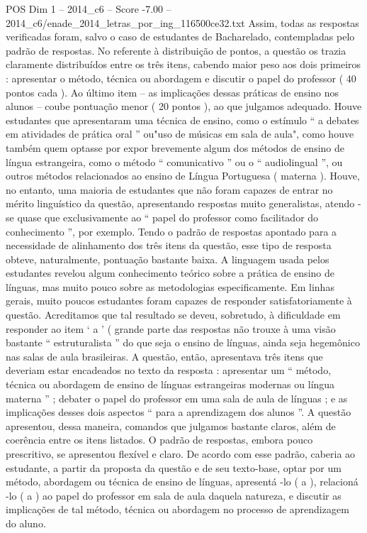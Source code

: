 \begin{textsample}{POS Dim 1 – 2014\_c6 – Score -7.00 – 2014\_c6/enade\_2014\_letras\_por\_ing\_116500ce32.txt}
Assim, todas as respostas verificadas foram, salvo o caso de estudantes de Bacharelado, contempladas pelo padrão de respostas.
No referente à distribuição de pontos, a questão os trazia claramente distribuídos entre os três itens, cabendo maior peso aos dois primeiros : apresentar o método, técnica ou abordagem e discutir o papel do professor ( 40 pontos cada ).
Ao último item – as implicações dessas práticas de ensino nos alunos – coube pontuação menor ( 20 pontos ), ao que julgamos adequado.
Houve estudantes que apresentaram uma técnica de ensino, como o estímulo “ a debates em atividades de prática oral ” ou"uso de músicas em sala de aula", como houve também quem optasse por expor brevemente algum dos métodos de ensino de língua estrangeira, como o método “ comunicativo ” ou o “ audiolingual ”, ou outros métodos relacionados ao ensino de Língua Portuguesa ( materna ).
Houve, no entanto, uma maioria de estudantes que não foram capazes de entrar no mérito linguístico da questão, apresentando respostas muito generalistas, atendo -se quase que exclusivamente ao “ papel do professor como facilitador do conhecimento ”, por exemplo.
Tendo o padrão de respostas apontado para a necessidade de alinhamento dos três itens da questão, esse tipo de resposta obteve, naturalmente, pontuação bastante baixa.
A linguagem usada pelos estudantes revelou algum conhecimento teórico sobre a prática de ensino de línguas, mas muito pouco sobre as metodologias especificamente.
Em linhas gerais, muito poucos estudantes foram capazes de responder satisfatoriamente à questão.
Acreditamos que tal resultado se deveu, sobretudo, à dificuldade em responder ao item ‘ a ’ ( grande parte das respostas não trouxe à uma visão bastante “ estruturalista ” do que seja o ensino de línguas, ainda seja hegemônico nas salas de aula brasileiras.
A questão, então, apresentava três itens que deveriam estar encadeados no texto da resposta : apresentar um “ método, técnica ou abordagem de ensino de línguas estrangeiras modernas ou língua materna ” ; debater o papel do professor em uma sala de aula de línguas ; e as implicações desses dois aspectos “ para a aprendizagem dos alunos ”.
A questão apresentou, dessa maneira, comandos que julgamos bastante claros, além de coerência entre os itens listados.
O padrão de respostas, embora pouco prescritivo, se apresentou flexível e claro.
De acordo com esse padrão, caberia ao estudante, a partir da proposta da questão e de seu texto-base, optar por um método, abordagem ou técnica de ensino de línguas, apresentá -lo ( a ), relacioná -lo ( a ) ao papel do professor em sala de aula daquela natureza, e discutir as implicações de tal método, técnica ou abordagem no processo de aprendizagem do aluno.

\end{textsample}
